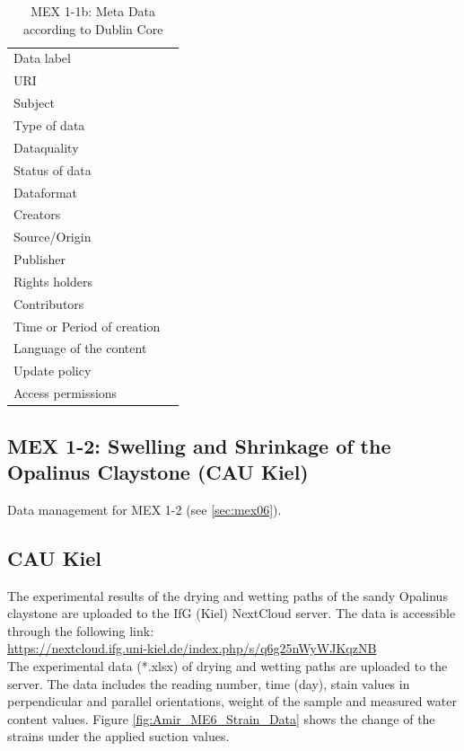 \begin{table}[h!]
\caption{MEX 1-1b: Meta Data according to Dublin Core}
\label{tab:}
\small
\begin{tabular}{R{3cm}|L{7cm}}
\hline
%
Data label &  \\
URI &  \\
Subject  &  \\
Type of data  &  \\
Dataquality  &  \\
Status of data  &  \\
Dataformat  & \\
Creators  &  \\
Source/Origin &  \\
Publisher  &  \\
Rights holders &  \\
Contributors &  \\
Time or Period of creation &  \\
Language of the content &  \\
Update policy &  \\
Access permissions &  \\
%
\hline
\end{tabular}
\end{table}

\subsection{MEX 1-2: Swelling and Shrinkage of the Opalinus Claystone (CAU Kiel)}

Data management for MEX 1-2 (see \ref{sec:mex06}).


\subsection*{CAU Kiel}

The experimental results of the drying and wetting paths of the sandy Opalinus claystone are uploaded to the IfG (Kiel) NextCloud server. The data is accessible through the following link:\\
\hyperlink{https://nextcloud.ifg.uni-kiel.de/index.php/s/q6g25nWyWJKqzNB}{https://nextcloud.ifg.uni-kiel.de/index.php/s/q6g25nWyWJKqzNB}\\

The experimental data (*.xlsx) of drying and wetting paths are uploaded to the server. The data includes the reading number, time (day), stain values in perpendicular and parallel orientations, weight of the sample and measured water content values. Figure \ref{fig:Amir_ME6_Strain_Data} shows the change of the strains under the applied suction values.


